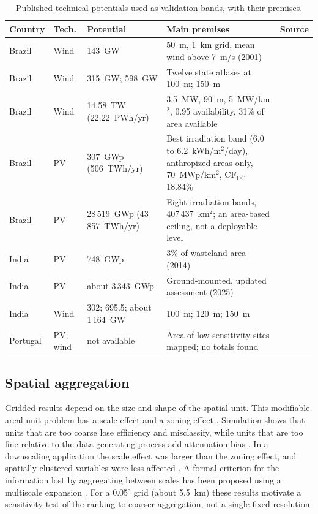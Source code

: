 \begin{table}[ht]
\centering
\caption{Published technical potentials used as validation bands, with their premises.}
\label{tab:g7-pot}
\footnotesize
\begin{tabular}{p{1.5cm}p{1.1cm}p{2.0cm}p{5.8cm}p{2.0cm}}
\toprule
Country & Tech. & Potential & Main premises & Source \\
\midrule
Brazil & Wind & 143~GW & 50~m, 1~km grid, mean wind above 7~m/s (2001) & \citet{amarante2001} \\
Brazil & Wind & 315~GW; 598~GW & Twelve state atlases at 100~m; 150~m & \citet{epe2020pne}\vfy{} \\
Brazil & Wind & 14.58~TW (22.22~PWh/yr) & 3.5~MW, 90~m, 5~MW/km$^2$, 0.95 availability, 31\% of area available & \citet{eurek2017} \\
Brazil & PV & 307~GWp (506~TWh/yr) & Best irradiation band (6.0 to 6.2~kWh/m$^2$/day), anthropized areas only, 70~MWp/km$^2$, CF$_{\mathrm{DC}}$ 18.84\% & \citet{epe2018potencial,denholm2008} \\
Brazil & PV & 28\,519~GWp (43\,857~TWh/yr) & Eight irradiation bands, 407\,437~km$^2$; an area-based ceiling, not a deployable level & \citet{epe2018potencial} \\
India & PV & 748~GWp & 3\% of wasteland area (2014) & \citet{mnre2024pib748}\vfy{} \\
India & PV & about 3\,343~GWp & Ground-mounted, updated assessment (2025) & \citet{nise2025ground}\vfy{} \\
India & Wind & 302; 695.5; about 1\,164~GW & 100~m; 120~m; 150~m & \citet{niwe_atlas}\vfy{} \\
Portugal & PV, wind & not available & Area of low-sensitivity sites mapped; no totals found & \citet{simoes2023lneg}\vfy{} \\
\bottomrule
\end{tabular}
\end{table}

\subsection{Spatial aggregation}
Gridded results depend on the size and shape of the spatial unit. This modifiable areal unit problem has a scale effect and a zoning effect \citep{openshaw1984}. Simulation shows that units that are too coarse lose efficiency and misclassify, while units that are too fine relative to the data-generating process add attenuation bias \citep{avelino2016}. In a downscaling application the scale effect was larger than the zoning effect, and spatially clustered variables were less affected \citep{dare2020}. A formal criterion for the information lost by aggregating between scales has been proposed using a multiscale expansion \citep{bradley_cage}. For a 0.05$^{\circ}$ grid (about 5.5~km) these results motivate a sensitivity test of the ranking to coarser aggregation, not a single fixed resolution.

